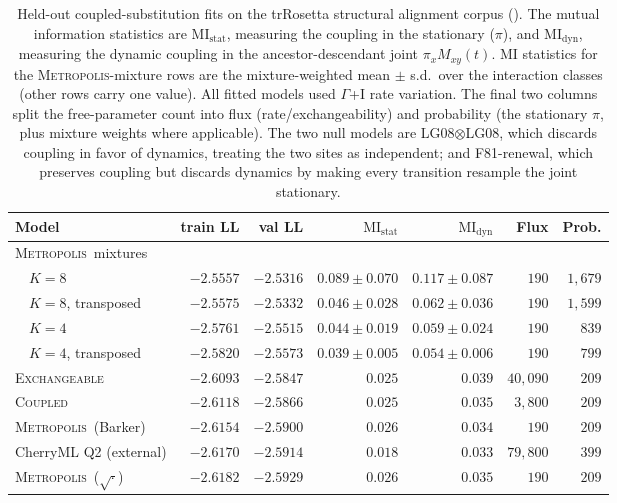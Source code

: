 \documentclass[11pt]{article}
\newcommand{\Coupledm}{\textsc{Coupled}}
\newcommand{\Exchm}{\textsc{Exchangeable}}
\newcommand{\Metrop}{\textsc{Metropolis}}
\begin{document}
\begin{table}[t]
\caption{Held-out coupled-substitution fits on the
trRosetta structural alignment corpus ().
The mutual information statistics are $\mathrm{MI_{stat}}$, measuring the coupling in the stationary ($\pi$),
and $\mathrm{MI_{dyn}}$, measuring the dynamic coupling in the ancestor-descendant joint $\pi_x M_{xy}(t)$.
MI statistics for the \Metrop-mixture rows are the mixture-weighted mean $\pm$ s.d.\ over the
interaction classes (other rows carry one value). All fitted models used $\Gamma$+I rate variation.
The final two columns split the free-parameter count into flux (rate/exchangeability) and probability (the stationary $\pi$, plus mixture weights where applicable).
The two null models are LG08$\otimes$LG08, which discards coupling in favor of dynamics, treating the two sites as independent;
and F81-renewal, which preserves coupling but discards dynamics by making every transition resample the joint stationary.
}
\label{tab:pairfit}
\centering
\setlength{\tabcolsep}{4pt}
\begin{tabular}{lrrrrrr}
\toprule
Model & train LL & val LL & $\mathrm{MI_{stat}}$ & $\mathrm{MI_{dyn}}$ & Flux & Prob.\\
\midrule
\Metrop\ mixtures & & & & & & \\
$\quad K{=}8$              & $-2.5557$ & $-2.5316$ & $0.089{\pm}0.070$ & $0.117{\pm}0.087$ & $190$ & $1{,}679$\\
$\quad K{=}8$, transposed  & $-2.5575$ & $-2.5332$ & $0.046{\pm}0.028$ & $0.062{\pm}0.036$ & $190$ & $1{,}599$\\
$\quad K{=}4$              & $-2.5761$ & $-2.5515$ & $0.044{\pm}0.019$ & $0.059{\pm}0.024$ & $190$ & $839$\\
$\quad K{=}4$, transposed  & $-2.5820$ & $-2.5573$ & $0.039{\pm}0.005$ & $0.054{\pm}0.006$ & $190$ & $799$\\
\midrule
\Exchm                        & $-2.6093$ & $-2.5847$ & $0.025$ & $0.039$ & $40{,}090$ & $209$\\
\Coupledm                     & $-2.6118$ & $-2.5866$ & $0.025$ & $0.035$ & $3{,}800$ & $209$\\
\Metrop\ (Barker)             & $-2.6154$ & $-2.5900$ & $0.026$ & $0.034$ & $190$ & $209$\\
CherryML Q2 (external)        & $-2.6170$ & $-2.5914$ & $0.018$ & $0.033$ & $79{,}800$ & $399$\\
\Metrop\ ($\sqrt{\cdot}$)     & $-2.6182$ & $-2.5929$ & $0.026$ & $0.035$ & $190$ & $209$\\

\end{tabular}
\end{table}
\end{document}
